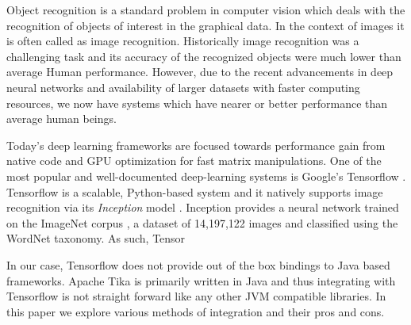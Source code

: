 Object recognition is a standard problem in computer vision which deals with the recognition of objects of interest in the graphical data. In the context of images it is often called as image recognition. Historically image recognition was a challenging task and its accuracy of the recognized objects were much lower than average Human performance. However, due to the recent advancements in deep neural networks and availability of larger datasets with faster computing resources, we now have systems which have nearer or better performance than average human beings\cite{karpathy-cnn-compare}.

Today's deep learning frameworks are focused towards performance gain from native code and GPU optimization for fast matrix manipulations. One of the most popular and well-documented deep-learning systems is Google's Tensorflow \cite{abadi2016tensorflow}. Tensorflow is a scalable, Python-based system and it natively supports image recognition via its {\em Inception} model \cite{abadi2016tensorflow}. Inception provides a neural network trained on the ImageNet corpus \cite{krizhevsky2012imagenet}, a dataset of 14,197,122 images and classified using the WordNet taxonomy. As such, Tensor 

 In our case, Tensorflow does not provide out of the box bindings to Java based frameworks. Apache Tika is primarily written in Java and thus integrating with Tensorflow is not straight forward like any other JVM compatible libraries. In this paper we explore various methods of integration and their pros and cons.





